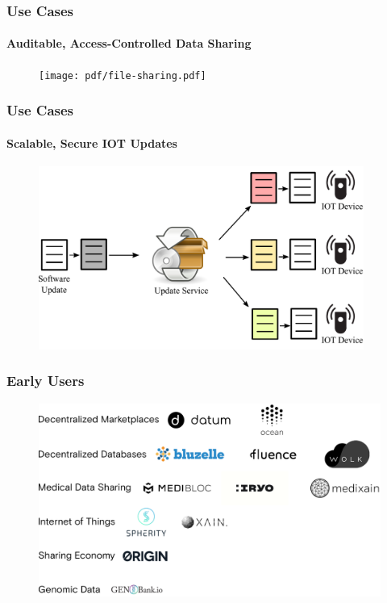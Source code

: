 \documentclass[xetex,mathsans,sans,aspectratio=169]{beamer}
\begin{document}
    \begin{frame}
        \frametitle{Use Cases}
        \framesubtitle{Auditable, Access-Controlled Data Sharing}
        \begin{figure}
            \centering
            \texttt{[image: pdf/file-sharing.pdf]}
        \end{figure}
    \end{frame}

    \begin{frame}
        \frametitle{Use Cases}
        \framesubtitle{Scalable, Secure IOT Updates}
        \begin{figure}
            \centering
            \includegraphics[height=6cm]{pdf/iot-updates.pdf}
        \end{figure}
    \end{frame}

    \begin{frame}
      \frametitle{Early Users}
      \begin{figure}
           \includegraphics[width=13cm]{pdf/projects.pdf}
      \end{figure}
    \end{frame}
\end{document}
